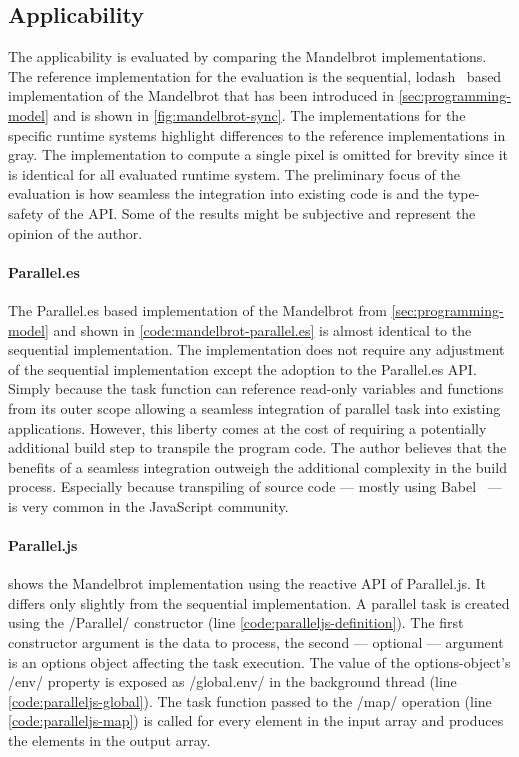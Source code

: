 \subsection{Applicability}
The applicability is evaluated by comparing the Mandelbrot implementations. The reference implementation for the evaluation is the sequential, lodash~\cite{lodash} based implementation of the Mandelbrot that has been introduced in \cref{sec:programming-model} and is shown in \cref{fig:mandelbrot-sync}. The implementations for the specific runtime systems highlight differences to the reference implementations in gray. The implementation to compute a single pixel is omitted for brevity since it is identical for all evaluated runtime system. The preliminary focus of the evaluation is how seamless the integration into existing code is and the type-safety of the API. Some of the results might be subjective and represent the opinion of the author. 

\paragraph{Parallel.es}
The Parallel.es based implementation of the Mandelbrot from \cref{sec:programming-model} and shown in  \cref{code:mandelbrot-parallel.es} is almost identical to the sequential implementation. The implementation does not require any adjustment of the sequential implementation except the adoption to the Parallel.es API. Simply because the task function can reference read-only variables and functions from its outer scope allowing a seamless integration of parallel task into existing applications. However, this liberty comes at the cost of requiring a potentially additional build step to transpile the program code. The author believes that the benefits of a seamless integration outweigh the additional complexity in the build process. Especially because transpiling of source code --- mostly using Babel~\cite{babel} --- is very common in the JavaScript community. 

\paragraph{Parallel.js}
 shows the Mandelbrot implementation using the reactive API of Parallel.js. It differs only slightly from the sequential implementation. A parallel task is created using the \javascriptinline/Parallel/ constructor (line \ref{code:paralleljs-definition}). The first constructor argument is the data to process, the second --- optional --- argument is an options object affecting the task execution. The value of the options-object's \javascriptinline/env/ property is exposed as \javascriptinline/global.env/ in the background thread (line \ref{code:paralleljs-global}). The task function passed to the \javascriptinline/map/ operation (line \ref{code:paralleljs-map}) is called for every element in the input array and produces the elements in the output array.

